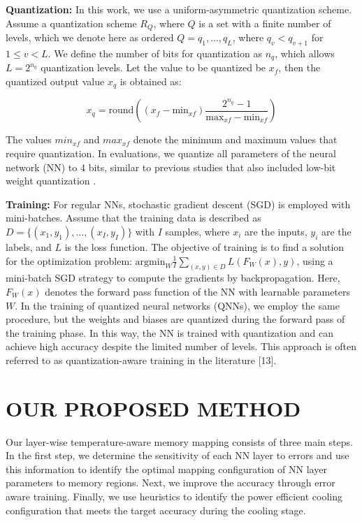 \documentclass[sigconf]{acmart}
\begin{document}
\textbf{Quantization: }In this work, we use a uniform-asymmetric quantization scheme. Assume a quantization scheme \( R_Q \), where \( Q \) is a set with a finite number of levels, which we denote here as ordered \( Q = q_1, \ldots, q_L \), where \( q_v < q_{v+1} \) for \( 1 \leq v < L \). We define the number of bits for quantization as \( n_q \), which allows \( L = 2^{n_q} \) quantization levels. Let the value to be quantized be \( x_f \), then the quantized output value \( x_q \) is obtained as:

\[
x_q = \text{round}\left((x_f - \text{min}_{xf}) \frac{2^{n_q} - 1}{\text{max}_{xf} - \text{min}_{xf}}\right) \tag{1}
\]

The values \(\textit{min}_{xf}\) and \(\textit{max}_{xf}\) denote the minimum and maximum values that require quantization. In evaluations, we quantize all parameters of the neural network (NN) to 4 bits, similar to previous studies that also included low-bit weight quantization \cite{ref13}.

\textbf{Training: }For regular NNs, stochastic gradient descent (SGD) is employed with mini-batches. Assume that the training data is described as \( D = \{(x_1, y_1), \ldots, (x_I, y_I)\} \) with \( I \) samples, where \( x_i \) are the inputs, \( y_i \) are the labels, and \( L \) is the loss function. The objective of training is to find a solution for the optimization problem: \(\text{argmin}_W \frac{1}{I} \sum_{(x,y) \in D} L(F_W(x), y)\), using a mini-batch SGD strategy to compute the gradients by backpropagation. Here, \(F_W(x)\) denotes the forward pass function of the NN with learnable parameters \(W\). In the training of quantized neural networks (QNNs), we employ the same procedure, but the weights and biases are quantized during the forward pass of the training phase. In this way, the NN is trained with quantization and can achieve high accuracy despite the limited number of levels. This approach is often referred to as quantization-aware training in the literature [13].

\section{OUR PROPOSED METHOD}

Our layer-wise temperature-aware memory mapping consists of three main steps. In the first step, we determine the sensitivity of each NN layer to errors and use this information to identify the optimal mapping configuration of NN layer parameters to memory regions. Next, we improve the accuracy through error aware training. Finally, we use heuristics to identify the power efficient cooling configuration that meets the target accuracy during the cooling stage.
\end{document}
